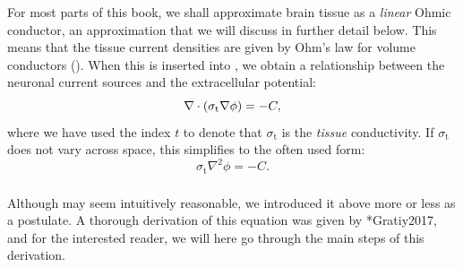 For most parts of this book, we shall approximate brain tissue as a \textit{linear} Ohmic conductor, an approximation that we will discuss in further detail below. This means that the tissue current densities are given by Ohm's law for volume conductors (). When this is inserted into , we obtain a relationship between the neuronal current sources and the extracellular potential:
\begin{equation}
{\bf \nabla} \cdot \left(\sigma_\text{t} {\bf \nabla} {\phi} \right) = -C,
\label{eq:Basics:continuity2}
\end{equation}
where we have used the index $t$ to denote that $\sigma_\text{t}$ is the \textit{tissue} conductivity. If $\sigma_\text{t}$ does not vary across space, this simplifies to the often used form:
\begin{equation}
\sigma_\text{t} \nabla^2{\phi} = -C.
\label{eq:Basics:continuity3}
\end{equation}


\subsubsection{}
\label{sec:Basics:C2}
Although   may seem intuitively reasonable, we introduced it above more or less as a postulate. A thorough derivation of this equation was given by \citeasnoun**{Gratiy2017}, and for the interested reader, we will here go through the main steps of this derivation. 

